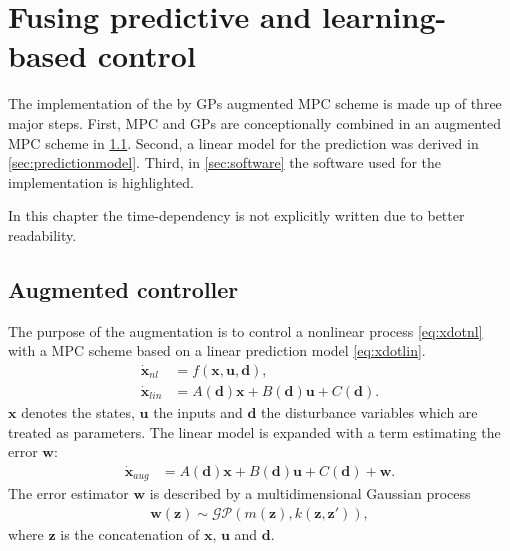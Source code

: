 \chapter{Fusing predictive and learning-based control}
\label{cha:implementation}
The implementation of the by GPs augmented MPC scheme is made up of three major steps.
First, MPC and GPs are conceptionally combined in an augmented MPC scheme in \cref{sec:augmentedcontroller}.
Second, a linear model for the prediction was derived in \cref{sec:predictionmodel}.
Third, in \cref{sec:software} the software used for the implementation is highlighted.

In this chapter the time-dependency is not explicitly written due to better readability.

\section{Augmented controller}
\label{sec:augmentedcontroller}
The purpose of the augmentation is to control a nonlinear process \eqref{eq:xdotnl} with a MPC scheme based on a linear prediction model \eqref{eq:xdotlin}.
\begin{align}
\dot{\mathbf{x}}_{nl} &= f \left( \mathbf{x},\mathbf{u},\mathbf{d} \right) \label{eq:xdotnl},\\
\dot{\mathbf{x}}_{lin} &= A \left( \mathbf{d} \right) \mathbf{x} + B \left( \mathbf{d} \right) \mathbf{u} + C \left( \mathbf{d} \right). \label{eq:xdotlin}
\end{align}
$\mathbf{x}$ denotes the states, $\mathbf{u}$ the inputs and $\mathbf{d}$ the disturbance variables which are treated as parameters.
The linear model is expanded with a term estimating the error $\mathbf{w}$:
\begin{align}
\dot{\mathbf{x}}_{aug} &= A \left( \mathbf{d} \right) \mathbf{x} + B \left( \mathbf{d} \right) \mathbf{u} + C \left( \mathbf{d} \right) + \mathbf{w}. \label{eq:xdotaug}
\end{align}
The error estimator $\mathbf{w}$ is described by a multidimensional Gaussian process
\begin{align}
\mathbf{w} \left(\mathbf{z}\right) \sim \mathcal{GP}\left( m \left(\mathbf{z} \right),k \left(\mathbf{z},\mathbf{z}' \right) \right),
\end{align}
where $\mathbf{z}$ is the concatenation of $\mathbf{x}$, $\mathbf{u}$ and $\mathbf{d}$.

